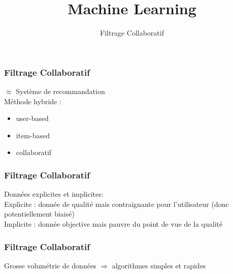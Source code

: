\documentclass{formation}
\title{Machine Learning}
\subtitle{Filtrage Collaboratif}
\begin{document}
\maketitle

\begin{frame}
  \frametitle{Filtrage Collaboratif}
  $\approx$ Système de recommandation \\
  \newline
  Méthode hybride :
  \begin{itemize}
  \item user-based
  \item item-based
  \item collaboratif
  \end{itemize}
\end{frame}

\begin{frame}
  \frametitle{Filtrage Collaboratif}
  Données explicites et implicites:\\
  Explicite : donnée de qualité mais contraignante pour l'utilisateur (donc potentiellement biaisé)\\
  Implicite : donnée objective mais pauvre du point de vue de la qualité  
\end{frame}

\begin{frame}
  \frametitle{Filtrage Collaboratif}
  Grosse volumétrie de données $\Rightarrow$ algorithmes simples et rapides 
\end{frame}
\end{document}

